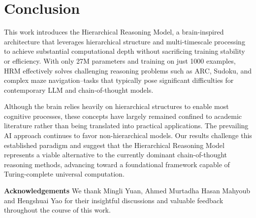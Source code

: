 \section{Conclusion}

This work introduces the Hierarchical Reasoning Model, a brain-inspired architecture that leverages hierarchical structure and multi-timescale processing to achieve substantial computational depth without sacrificing training stability or efficiency. With only 27M parameters and training on just 1000 examples, HRM effectively solves challenging reasoning problems such as ARC, Sudoku, and complex maze navigation--tasks that typically pose significant difficulties for contemporary LLM and chain-of-thought models.

Although the brain relies heavily on hierarchical structures to enable most cognitive processes, these concepts have largely remained confined to academic literature rather than being translated into practical applications. 
The prevailing AI approach continues to favor non-hierarchical models. Our results challenge this established paradigm and suggest that the Hierarchical Reasoning Model represents a viable alternative to the currently dominant chain-of-thought reasoning methods, advancing toward a foundational framework capable of Turing-complete universal computation.

\textbf{Acknowledgements} We thank Mingli Yuan, Ahmed Murtadha Hasan Mahyoub and Hengshuai Yao for their insightful discussions and valuable feedback throughout the course of this work.
